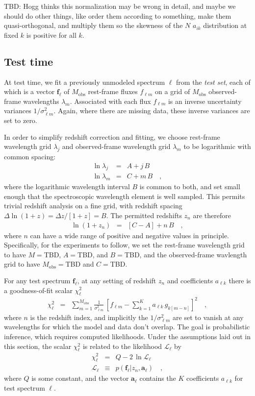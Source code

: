 \documentclass[preprint]{aastex}
\newcommand{\mmatrix}[1]{\boldsymbol{#1}}
\newcommand{\avec}{\mmatrix{a}}
\newcommand{\fvec}{\mmatrix{f}}
\newcommand{\obs}{\mathrm{obs}}
\newcommand{\like}{\mathscr{L}}
\begin{document}
TBD: Hogg thinks this normalization may be wrong in detail, and maybe
we should do other things, like order them according to something,
make them quasi-orthogonal, and multiply them so the skewness of the
$N$ $a_{ik}$ distribution at fixed $k$ is positive for all $k$.

\subsection{Test time}

At test time, we fit a previously unmodeled spectrum $\ell$ from the
\emph{test set}, each of which is a vector $\fvec_\ell$ of $M_\obs$
rest-frame fluxes $f_{\ell m}$ on a grid of $M_\obs$ observed-frame
wavelengths $\lambda_m$.  Associated with each flux $f_{\ell m}$ is an
inverse uncertainty variances $1/\sigma^2_{\ell m}$.  Again, where
there are missing data, these inverse variances are set to zero.

In order to simplify redshift correction and fitting, we choose
rest-frame wavelength grid $\lambda_j$ and observed-frame wavelength
grid $\lambda_m$ to be logarithmic with common spacing:
\begin{eqnarray}\displaystyle
\ln\lambda_j &=& A + j\,B \nonumber\\
\ln\lambda_m &=& C + m\,B
\quad ,
\end{eqnarray}
where the logarithmic wavelength interval $B$ is common to both, and
set small enough that the spectroscopic wavelength element is well
sampled.  This permits trivial redshift analysis on a fine grid, with
redshift spacing $\Delta\ln(1+z)=\Delta z/[1+z]=B$.  The permitted
redshifts $z_n$ are therefore
\begin{eqnarray}\displaystyle
\ln(1+z_n) &=& [C - A] + n\,B
\quad ,
\end{eqnarray}
where $n$ can have a wide range of positive and negative values in
principle.  Specifically, for the experiments to follow, we set the
rest-frame wavelength grid to have $M=$TBD, $A=$TBD, and $B=$TBD, and
the observed-frame wavlength grid to have $M_\obs=$TBD and $C=$TBD.

For any test spectrum $\fvec_\ell$, at any setting of redshift $z_n$
and coefficients $a_{\ell k}$ there is a goodness-of-fit scalar
$\chi^2_\ell$
\begin{eqnarray}\displaystyle
\chi^2_\ell &=& \sum_{m=1}^{M_\obs} \frac{1}{\sigma^2_{\ell m}}
 \,\left[f_{\ell m} - \sum_{k=1}^K a_{\ell k}\,g_{k[m-n]}\right]^2
\quad,
\end{eqnarray}
where $n$ is the redshift index, and implicitly the $1/\sigma^2_{\ell
  m}$ are set to vanish at any wavelengths for which the model and
data don't overlap.  The goal is probabilistic inference, which
requires computed likelihoods.  Under the assumptions laid out in this
section, the scalar $\chi^2_\ell$ is related to the likelihood
$\like_\ell$ by
\begin{eqnarray}\displaystyle
\chi^2_\ell &=& Q - 2\,\ln\like_\ell \nonumber\\
\like_\ell &\equiv& p(\fvec_\ell|z_n,\avec_\ell)
\quad ,
\end{eqnarray}
where $Q$ is some constant, and the vector $\avec_\ell$ contains the
$K$ coefficients $a_{\ell k}$ for test spectrum $\ell$.
\end{document}

